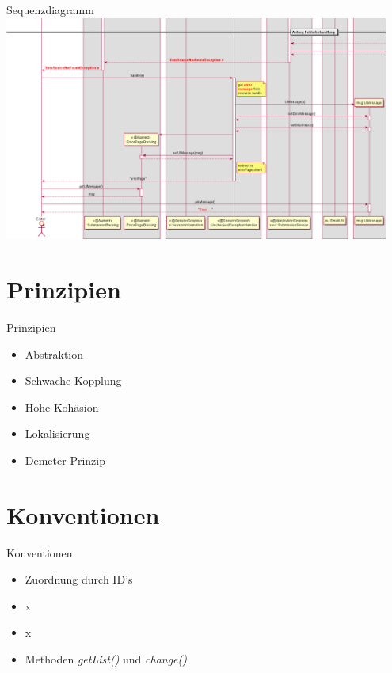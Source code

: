 \documentclass{beamer}
\begin{document}
    \begin{frame}{Sequenzdiagramm}
        \centering
        \includegraphics[width=0.95\textwidth]{excerpts/sequence2_2}
    \end{frame}
    

    \section{Prinzipien}

    \begin{frame}{Prinzipien}
        \begin{itemize}
            \item Abstraktion \pause
            \item Schwache Kopplung \pause
            \item Hohe Kohäsion \pause
            \item Lokalisierung \pause
            \item Demeter Prinzip
        \end{itemize}
    \end{frame}


    \section{Konventionen}
    \begin{frame}{Konventionen}
        \pause
        \begin{itemize}
            \item Zuordnung durch ID's
            \item x 
            \item x \textrightarrow * \pause
            \item Methoden \emph{getList()} und \emph{change()}
        \end{itemize}
    \end{frame}
\end{document}
